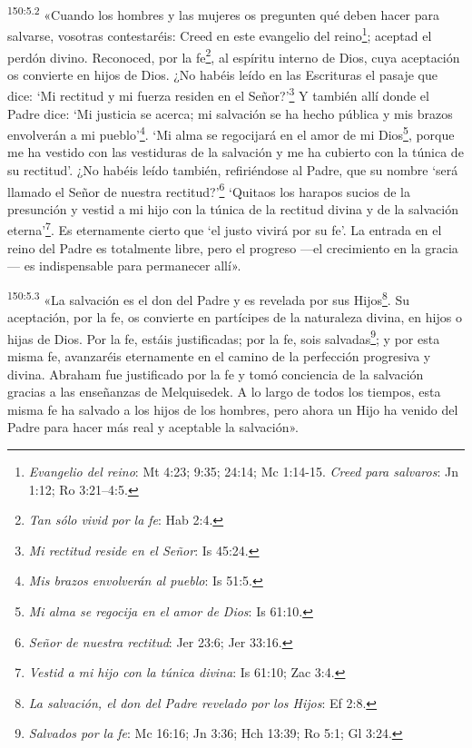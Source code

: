 \par
\textsuperscript{150:5.2} «Cuando los hombres y las mujeres os pregunten qué deben hacer para salvarse, vosotras contestaréis: Creed en este evangelio del reino\footnote{\textit{Evangelio del reino}: Mt 4:23; 9:35; 24:14; Mc 1:14-15. \textit{Creed para salvaros}: Jn 1:12; Ro 3:21--4:5.}; aceptad el perdón divino. Reconoced, por la fe\footnote{\textit{Tan sólo vivid por la fe}: Hab 2:4.}, al espíritu interno de Dios, cuya aceptación os convierte en hijos de Dios. ¿No habéis leído en las Escrituras el pasaje que dice: `Mi rectitud y mi fuerza residen en el Señor?'\footnote{\textit{Mi rectitud reside en el Señor}: Is 45:24.} Y también allí donde el Padre dice: `Mi justicia se acerca; mi salvación se ha hecho pública y mis brazos envolverán a mi pueblo'\footnote{\textit{Mis brazos envolverán al pueblo}: Is 51:5.}. `Mi alma se regocijará en el amor de mi Dios\footnote{\textit{Mi alma se regocija en el amor de Dios}: Is 61:10.}, porque me ha vestido con las vestiduras de la salvación y me ha cubierto con la túnica de su rectitud'. ¿No habéis leído también, refiriéndose al Padre, que su nombre `será llamado el Señor de nuestra rectitud?'\footnote{\textit{Señor de nuestra rectitud}: Jer 23:6; Jer 33:16.} `Quitaos los harapos sucios de la presunción y vestid a mi hijo con la túnica de la rectitud divina y de la salvación eterna'\footnote{\textit{Vestid a mi hijo con la túnica divina}: Is 61:10; Zac 3:4.}. Es eternamente cierto que `el justo vivirá por su fe'. La entrada en el reino del Padre es totalmente libre, pero el progreso ---el crecimiento en la gracia--- es indispensable para permanecer allí».

\par
\textsuperscript{150:5.3} «La salvación es el don del Padre y es revelada por sus Hijos\footnote{\textit{La salvación, el don del Padre revelado por los Hijos}: Ef 2:8.}. Su aceptación, por la fe, os convierte en partícipes de la naturaleza divina, en hijos o hijas de Dios. Por la fe, estáis justificadas; por la fe, sois salvadas\footnote{\textit{Salvados por la fe}: Mc 16:16; Jn 3:36; Hch 13:39; Ro 5:1; Gl 3:24.}; y por esta misma fe, avanzaréis eternamente en el camino de la perfección progresiva y divina. Abraham fue justificado por la fe y tomó conciencia de la salvación gracias a las enseñanzas de Melquisedek. A lo largo de todos los tiempos, esta misma fe ha salvado a los hijos de los hombres, pero ahora un Hijo ha venido del Padre para hacer más real y aceptable la salvación».

